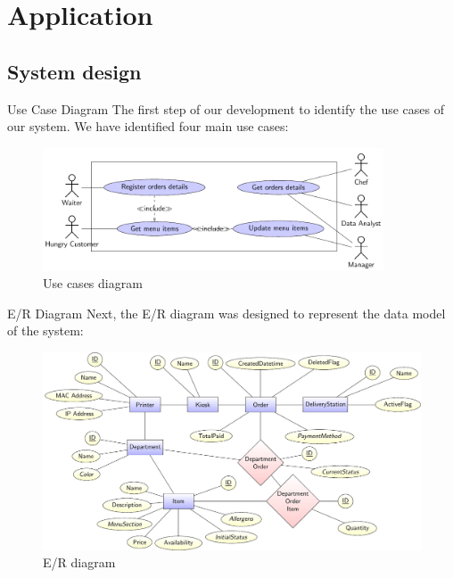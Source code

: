 

\section[Application]{Application}

\subsection[System design]{System design}

\begin{frame}{Use Case Diagram}
	The first step of our development to identify the use cases of our system.
	We have identified four main use cases:

	\begin{figure}[h!]
		\centering
		\includegraphics[width=0.9\textwidth,height=0.55\textheight,keepaspectratio]{images/usecases}
		\caption{Use cases diagram}
		\label{fig:usecases}
	\end{figure}

\end{frame}

\begin{frame}{E/R Diagram}
	Next, the E/R diagram was designed to represent the data model of the
	system:

	\begin{figure}[h!]
		\centering
		\includegraphics[width=\textwidth,height=0.6\textheight,keepaspectratio]{images/er}
		\caption{E/R diagram}
		\label{fig:er}
	\end{figure}

\end{frame}

